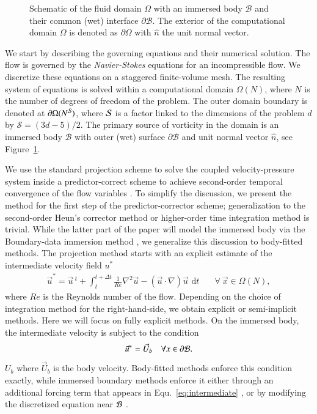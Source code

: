 \documentclass[preprint,12pt]{elsarticle}
\begin{document}
\begin{figure}
    \centering
    \def\svgwidth{0.8\columnwidth}
    
    \caption{Schematic of the fluid domain $\Omega$ with an immersed body $\mathcal{B}$ and their common (wet) interface $\partial\mathcal{B}$. The exterior of the computational domain $\Omega$ is denoted as $\partial\Omega$ with $\hat{n}$ the unit normal vector.}
    \label{Fig_1}
\end{figure}

We start by describing the governing equations and their numerical solution.
The flow is governed by the \emph{Navier-Stokes} equations for an incompressible flow. We discretize these equations on a staggered finite-volume mesh. The resulting system of equations is solved within a computational domain $\Omega(N)$, where $N$ is the number of degrees of freedom of the problem. The outer domain boundary is denoted at $\partial\Omega(N^{\cal S})$, where $\cal S$ is a factor  linked to the dimensions of the problem $d$ by $\mathcal{S}=(3d-5)/2$. The primary source of vorticity in the domain is an immersed body $\mathcal{B}$ with outer (wet) surface $\partial\mathcal{B}$ and unit normal vector $\hat n$, see Figure~\ref{Fig_1}.

We use the standard projection scheme \cite{Chorin1967} to solve the coupled velocity-pressure system inside a predictor-correct scheme to achieve second-order temporal convergence of the flow variables \cite{Lauber2022}. 
To simplify the discussion, we present the method for the first step of the predictor-corrector scheme; generalization to the second-order Heun's corrector method or higher-order time integration method is trivial. While the latter part of the paper will model the immersed body via the Boundary-data immersion method \cite{Maertens2015}, we generalize this discussion to body-fitted methods.
The projection method starts with an explicit estimate of the intermediate velocity field $u^*$
\begin{align}\label{eq:intermediate}
    \vec{u}^* = \vec{u}\,^t + \int_{t}^{t+\Delta t}\frac{1}{Re}\nabla^2\vec{u} -\left(\vec{u}\cdot\nabla\right)\vec{u}\text{ d}t &\quad\forall\ \vec{x}\in\Omega (N),
\end{align}
where $Re$ is the Reynolds number of the flow. Depending on the choice of integration method for the right-hand-side, we obtain explicit or semi-implicit methods. Here we will focus on fully explicit methods. On the immersed body, the intermediate velocity is subject to the condition
\begin{equation}
    \vec{u}^* = \vec{U}_b \quad \forall x \in \partial\cal{B}.
\end{equation}$U_b$ 
where $\vec{U}_b$ is the body velocity. Body-fitted methods enforce this condition exactly, while immersed boundary methods enforce it either through an additional forcing term that appears in Equ.~\ref{eq:intermediate} \cite{Peskin2010}, or by modifying the discretized equation near $\cal{B}$ \cite{Lee2015}.
\end{document}
